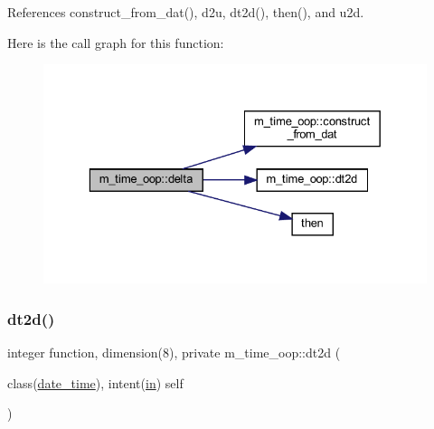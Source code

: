References construct\+\_\+from\+\_\+dat(), d2u, dt2d(), then(), and u2d.

Here is the call graph for this function\+:
\nopagebreak
\begin{figure}[H]
\begin{center}
\leavevmode
\includegraphics[width=329pt]{namespacem__time__oop_aecd1edc1f6ca447d5381c8092eba7924_cgraph}
\end{center}
\end{figure}
\mbox{\label{namespacem__time__oop_ac68405e5566d5aec59cd1fba7145130c}} 
\subsubsection{\texorpdfstring{dt2d()}{dt2d()}}
{\footnotesize\ttfamily integer function, dimension(8), private m\+\_\+time\+\_\+oop\+::dt2d (\begin{DoxyParamCaption}\item[{class(\hyperlink{structm__time__oop_1_1date__time}{date\+\_\+time}), intent(\hyperlink{M__journal_83_8txt_afce72651d1eed785a2132bee863b2f38}{in})}]{self }\end{DoxyParamCaption})\hspace{0.3cm}{\ttfamily [private]}}

